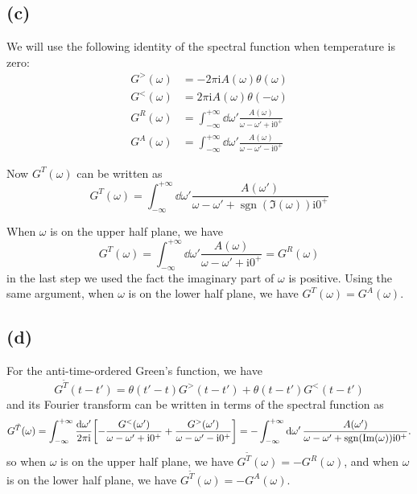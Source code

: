 \documentclass{article}
\newcommand{\ii}{\mathrm{i}}
\DeclareMathOperator{\sgn}{sgn}
\begin{document}
\subsection*{(c)}
We will use the following identity of the spectral function when temperature is zero:
\begin{subequations}
    \begin{align}
        G^{>}(\omega)&=-2\pi\ii A(\omega)\theta(\omega)\\
        G^{<}(\omega)&=2\pi\ii A(\omega)\theta(-\omega)\\
        G^{R}(\omega)&= \int_{-\infty}^{+\infty}\dd{\omega'}\frac{A(\omega)}{\omega-\omega'+\ii0^{+}}\\
        G^{A}(\omega)&= \int_{-\infty}^{+\infty}\dd{\omega'}\frac{A(\omega)}{\omega-\omega'-\ii0^{+}}
    \end{align}
\end{subequations}

Now $G^{T}(\omega)$ can be written as
\begin{equation}
    G^{T}(\omega)=\int_{-\infty}^{+\infty}\dd{\omega'}\frac{A(\omega')}{\omega-\omega'+\sgn(\Im(\omega))\ii 0^+}
\end{equation}

When $\omega$ is on the upper half plane, we have 
\begin{equation}
    G^{T}(\omega)=\int_{-\infty}^{+\infty}\dd{\omega'}\frac{A(\omega)}{\omega-\omega'+\ii0^{+}}=G^R(\omega)
\end{equation}
in the last step we used the fact the imaginary part of $\omega$ is positive.
Using the same argument, when $\omega$ is on the lower half plane, we have $G^{T}(\omega)=G^{A}(\omega)$.

\subsection*{(d)}
For the anti-time-ordered Green's function, we have
\begin{equation}
    G^{\tilde{T}}(t-t')=\theta(t'-t)G^{>}(t-t')+\theta(t-t')G^{<}(t-t')
\end{equation}
and its Fourier transform can be written in terms of the spectral function as
\begin{equation}
    G^{\tilde{T}}(\omega)=\int_{-\infty}^{+\infty}\frac{\dd{\omega'}}{2\pi\ii}\qty[-\frac{G^<(\omega')}{\omega-\omega'+\ii0^{+}}+\frac{G^>(\omega')}{\omega-\omega'-\ii0^{+}}]=-\int_{-\infty}^{+\infty}\dd{\omega'}\frac{A(\omega')}{\omega-\omega'+\sgn(\Im(\omega))\ii 0^+}.
\end{equation}
so when $\omega$ is on the upper half plane, we have $G^{\tilde{T}}(\omega)=-G^R(\omega)$, and when $\omega$ is on the lower half plane, we have $G^{\tilde{T}}(\omega)=-G^A(\omega)$.
\end{document}
